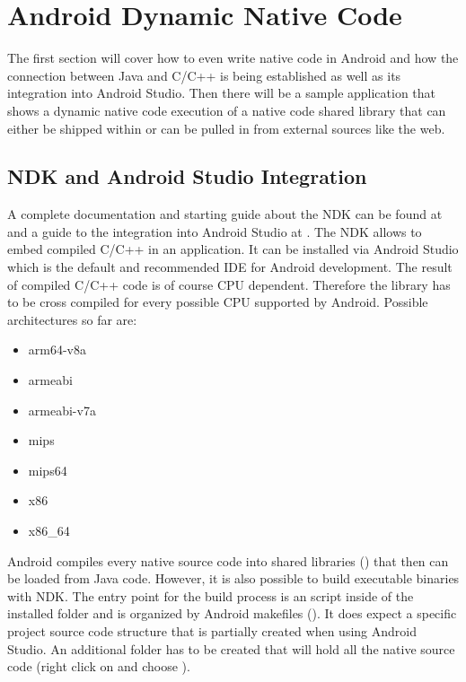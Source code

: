 \chapter{Android Dynamic Native Code}\label{chapter:android_dynamic_native_code}

The first section will cover how to even write native code in Android and how
the connection between Java and C/C++ is being established as well as its
integration into Android Studio.
Then there will be a sample application that shows a dynamic native code execution of a native code shared library that can either be shipped within  or can be pulled in from external sources like the web.

\section{NDK and Android Studio Integration}\label{section:ndk_integration}
A complete documentation and starting guide about the NDK can be found at \parencite{ndk} and a guide to the integration into Android Studio at \parencite{ndk_integration}.
The NDK allows to embed compiled C/C++ in an application. It can be installed via Android Studio which is the default and recommended IDE for Android development.
The result of compiled C/C++ code is of course CPU dependent. Therefore the library has to be cross compiled for 
every possible CPU supported by Android. Possible architectures so far are:
\begin{itemize}
\item arm64-v8a
\item armeabi
\item armeabi-v7a
\item mips
\item mips64
\item x86
\item x86\_64
\end{itemize}
Android compiles every native source code into shared libraries () that then can be loaded from Java code. However, it is also possible to build executable binaries with NDK. The entry point for the build process is an  script inside of the installed  folder and is organized by Android makefiles
(). It does expect a specific project source code structure that is
partially created when using Android Studio. An additional  folder has to be created that will hold all the native source code (right click on  and choose ). 

